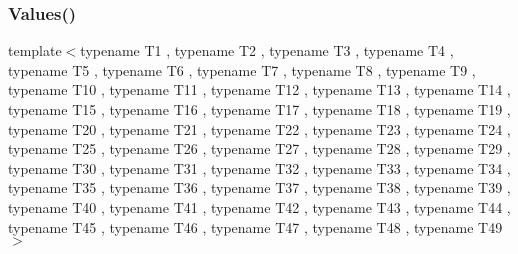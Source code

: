 \mbox{\label{namespacetesting_a034785cd0f04e5f5ec9e16c1cad5ccde}} 
\subsubsection{\texorpdfstring{Values()}{Values()}\hspace{0.1cm}{\footnotesize\ttfamily [50/51]}}
{\footnotesize\ttfamily template$<$typename T1 , typename T2 , typename T3 , typename T4 , typename T5 , typename T6 , typename T7 , typename T8 , typename T9 , typename T10 , typename T11 , typename T12 , typename T13 , typename T14 , typename T15 , typename T16 , typename T17 , typename T18 , typename T19 , typename T20 , typename T21 , typename T22 , typename T23 , typename T24 , typename T25 , typename T26 , typename T27 , typename T28 , typename T29 , typename T30 , typename T31 , typename T32 , typename T33 , typename T34 , typename T35 , typename T36 , typename T37 , typename T38 , typename T39 , typename T40 , typename T41 , typename T42 , typename T43 , typename T44 , typename T45 , typename T46 , typename T47 , typename T48 , typename T49 $>$ \\
}
